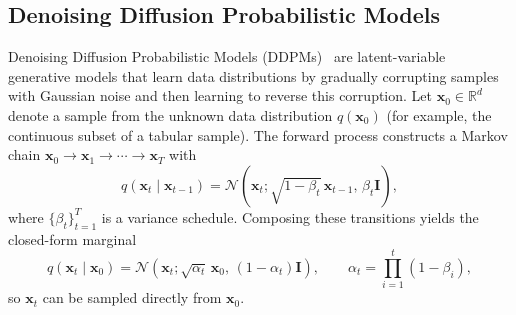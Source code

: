 \documentclass[times, review, 10pt]{elsarticle}
\begin{document}



\subsection{Denoising Diffusion Probabilistic Models}
\label{sec:background:ddpm}

Denoising Diffusion Probabilistic Models (DDPMs)~\citep{ddpm} are latent-variable generative models that learn data distributions by gradually corrupting samples with Gaussian noise and then learning to reverse this corruption. Let $\mathbf{x}_0 \in \mathbb{R}^d$ denote a sample from the unknown data distribution $q(\mathbf{x}_0)$ (for example, the continuous subset of a tabular sample). The forward process constructs a Markov chain $\mathbf{x}_0 \rightarrow \mathbf{x}_1 \rightarrow \cdots \rightarrow \mathbf{x}_T$ with
\[
q(\mathbf{x}_t \mid \mathbf{x}_{t-1})
= \mathcal{N}\!\left(
\mathbf{x}_t;\sqrt{1-\beta_t}\,\mathbf{x}_{t-1},\,\beta_t \mathbf{I}
\right),
\]
where $\{\beta_t\}_{t=1}^T$ is a variance schedule. Composing these transitions yields the closed-form marginal
\begin{equation}
q(\mathbf{x}_t \mid \mathbf{x}_0)
= \mathcal{N}\!\left(
\mathbf{x}_t;\sqrt{\alpha_t}\,\mathbf{x}_0,\,(1-\alpha_t)\mathbf{I}
\right),
\qquad
\alpha_t = \prod_{i=1}^t (1-\beta_i),
\label{eq:ddpm-marginal}
\end{equation}
so $\mathbf{x}_t$ can be sampled directly from $\mathbf{x}_0$.
\end{document}
